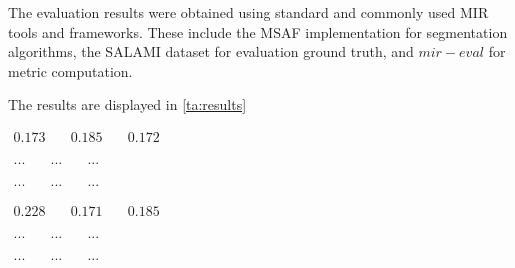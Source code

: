 
The evaluation results were obtained using standard and commonly used MIR tools and frameworks. These include the MSAF \cite{MSAF} implementation for segmentation algorithms, the SALAMI dataset \cite{Smith2011DESIGNANNOTATIONS} for evaluation ground truth, and $mir-eval$ \cite{RaffelMir_eval:METRICS} for metric computation.

The results are displayed in \ref{ta:results}


\newsavebox\mfccSF
\begin{lrbox}{\mfccSF}
\centering
   $\begin{aligned}
     0.173 & \quad 0.185 & \quad 0.172 %
    \end{aligned} $
\end{lrbox}

\newsavebox\mfccFoote
\begin{lrbox}{\mfccFoote}
\centering
   $\begin{aligned}
     ... & \quad ... & \quad ... %
    \end{aligned} $
\end{lrbox}

\newsavebox\mfccCNMF
\begin{lrbox}{\mfccCNMF}
\centering
   $\begin{aligned}
     ... & \quad ... & \quad ... %
    \end{aligned} $
\end{lrbox}

\newsavebox\embeddioaSF
\begin{lrbox}{\embeddioaSF}
   $\begin{aligned}
     0.228 & \quad 0.171 & \quad 0.185
    \end{aligned} $
\end{lrbox}

\newsavebox\embeddioaFoote
\begin{lrbox}{\embeddioaFoote}
   $\begin{aligned}
     ... & \quad ... & \quad ...
    \end{aligned} $
\end{lrbox}

\newsavebox\embeddioaCNMF
\begin{lrbox}{\embeddioaCNMF}
   $\begin{aligned}
     ... & \quad ... & \quad ...
    \end{aligned} $
\end{lrbox}

